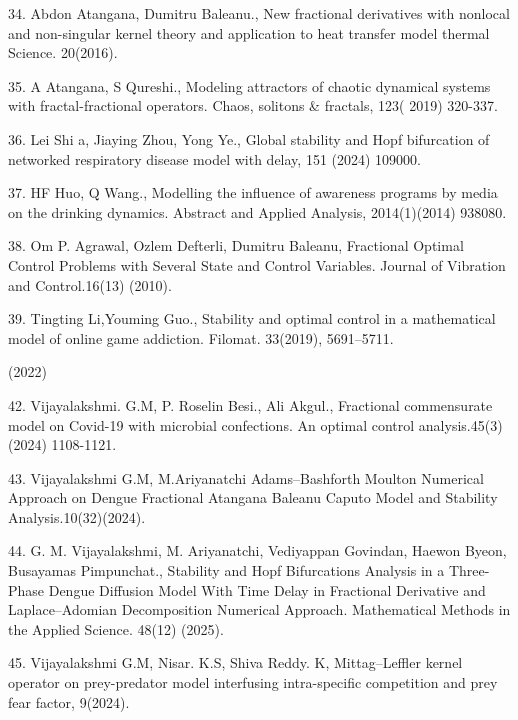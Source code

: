 \documentclass[10pt]{NSP1}
\begin{document}
	\par\medskip{}\smallskip
	
	34. Abdon Atangana, Dumitru Baleanu., New fractional derivatives with nonlocal and non-singular kernel theory and application to heat transfer model thermal Science. 20(2016).
	
	35. A Atangana, S Qureshi., Modeling attractors of chaotic dynamical systems with fractal-fractional operators. Chaos, solitons \& fractals, 123( 2019) 320-337.
	
	36. Lei Shi a, Jiaying Zhou, Yong Ye., Global stability and Hopf bifurcation of networked respiratory disease model with delay, 151 (2024) 109000.
	
	37. HF Huo, Q Wang., Modelling the influence of awareness programs by media on the drinking dynamics. Abstract and Applied Analysis, 2014(1)(2014) 938080.
	
	38. Om P. Agrawal, Ozlem Defterli, Dumitru Baleanu, Fractional Optimal Control Problems with Several State and Control Variables. Journal of Vibration and Control.16(13) (2010).
	
	39. Tingting Li,Youming Guo., Stability and optimal control in a mathematical model of online game addiction. Filomat. 33(2019), 5691–5711.
	
	\par\medskip{}\smallskip
	
	(2022)
	
	42. Vijayalakshmi. G.M, P. Roselin Besi., Ali Akgul., Fractional commensurate model on Covid-19 with microbial confections. An optimal control analysis.45(3) (2024) 1108-1121.
	
	43. Vijayalakshmi G.M, M.Ariyanatchi Adams–Bashforth Moulton Numerical Approach on Dengue Fractional Atangana Baleanu Caputo Model and Stability Analysis.10(32)(2024).
	
	44. G. M. Vijayalakshmi, M. Ariyanatchi, Vediyappan Govindan, Haewon Byeon, Busayamas Pimpunchat., Stability and Hopf Bifurcations Analysis in a Three-Phase Dengue Diffusion Model With Time Delay in Fractional Derivative and Laplace–Adomian Decomposition Numerical Approach. Mathematical Methods in the Applied Science. 48(12) (2025).
	
	45. Vijayalakshmi G.M, Nisar. K.S, Shiva Reddy. K, Mittag–Leffler kernel operator on prey-predator model interfusing intra-specific competition and prey fear factor, 9(2024).
	
\end{document}
